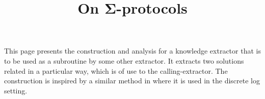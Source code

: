 \begin{define}
    \newcommand\Sample{\mathtt{Sample}}
    \newcommand\Clash{\mathtt{Clash}}
    \newcommand\Valid{\mathtt{Valid}}
\end{define}

This page presents the construction and analysis for a knowledge extractor that is to be used as a subroutine by some other extractor.
It extracts two solutions related in a particular way, which is of use to the calling-extractor.
The construction is inspired by a similar method in \cite{Dam10} where it is used in the discrete log setting.

\begin{references}
    \title{On Σ-protocols}
    \where{}
    \other
\end{references}

